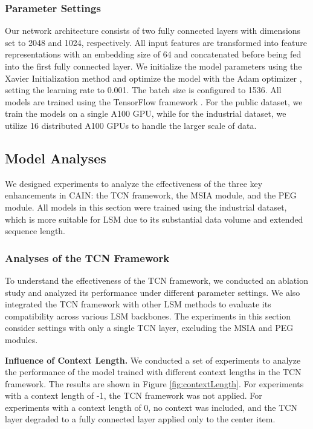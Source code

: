 \subsubsection{\textbf{Parameter Settings}} 

Our network architecture consists of two fully connected layers with dimensions set to 2048 and 1024, respectively. All input features are transformed into feature representations with an embedding size of 64 and concatenated before being fed into the first fully connected layer. We initialize the model parameters using the Xavier Initialization method \cite{glorot2010understanding} and optimize the model with the Adam optimizer \cite{kingma2014adam}, setting the learning rate to 0.001. The batch size is configured to 1536. All models are trained using the TensorFlow framework \cite{abadi2016tensorflow}. For the public dataset, we train the models on a single A100 GPU, while for the industrial dataset, we utilize 16 distributed A100 GPUs to handle the larger scale of data. 

\subsection{Model Analyses}
We designed experiments to analyze the effectiveness of the three key enhancements in CAIN: the TCN framework, the MSIA module, and the PEG module. All models in this section were trained using the industrial dataset, which is more suitable for LSM due to its substantial data volume and extended sequence length. 

\subsubsection{\textbf{Analyses of the TCN Framework}}

To understand the effectiveness of the TCN framework, we conducted an ablation study and analyzed its performance under different parameter settings. We also integrated the TCN framework with other LSM methods to evaluate its compatibility across various LSM backbones. The experiments in this section consider settings with only a single TCN layer, excluding the MSIA and PEG modules. 

\textbf{Influence of Context Length.} We conducted a set of experiments to analyze the performance of the model trained with different context lengths in the TCN framework. The results are shown in Figure \ref{fig:contextLength}. For experiments with a context length of -1, the TCN framework was not applied. For experiments with a context length of 0, no context was included, and the TCN layer degraded to a fully connected layer applied only to the center item. 

